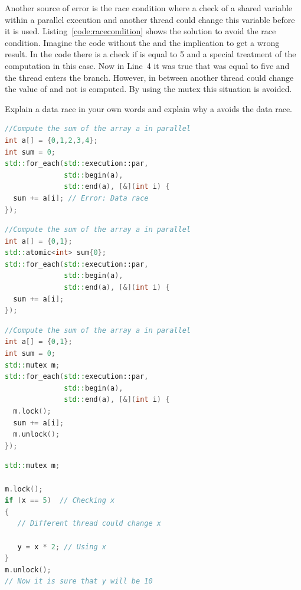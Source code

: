 \documentclass[11pt,fleqn]{book} %
\begin{document}
Another source of error is the race condition where a check of a shared variable within a parallel execution and another thread could change this variable before it is used. Listing~\ref{code:racecondition} shows the solution to avoid the race condition.  Imagine the code without the  and the implication to get a wrong result. In the code there is a check if  is equal to 5 and a special treatment of the computation in this case. Now in Line~4 it was true that  was equal to five and the thread enters the  branch. However, in between another thread could change the value of  and not  is computed. By using the mutex this situation is avoided.

\begin{exercise}
Explain a data race in your own words and explain why a  avoids the data race.
\end{exercise}

\begin{lstlisting}[language=c++,caption={Example code and Solution for a data race.\label{code:data:race}},float,floatplacement=tb]
//Compute the sum of the array a in parallel
int a[] = {0,1,2,3,4};
int sum = 0;
std::for_each(std::execution::par, 
              std::begin(a), 
              std::end(a), [&](int i) {
  sum += a[i]; // Error: Data race
});
\end{lstlisting}


\begin{lstlisting}[language=c++,caption={Solution to avoid the data race using \cpp{std::atomic}.\label{code:datarace:atomic}},float,floatplacement=tb]
//Compute the sum of the array a in parallel
int a[] = {0,1};
std::atomic<int> sum{0};
std::for_each(std::execution::par, 
              std::begin(a), 
              std::end(a), [&](int i) {
  sum += a[i]; 
});
\end{lstlisting}

\begin{lstlisting}[language=c++,caption={Solution to avoid the data race using \cpp{std::mutex}.\label{code:datarace:mutex}},float,floatplacement=tb]
//Compute the sum of the array a in parallel
int a[] = {0,1};
int sum = 0;
std::mutex m;
std::for_each(std::execution::par, 
              std::begin(a), 
              std::end(a), [&](int i) {
  m.lock();
  sum += a[i];
  m.unlock(); 
});
\end{lstlisting}


\begin{lstlisting}[language=c++,caption={Example for the race condition.\label{code:racecondition}},float,floatplacement=tb]
std::mutex m;

m.lock();
if (x == 5)  // Checking x
{
   // Different thread could change x 
      
   y = x * 2; // Using x
}
m.unlock();
// Now it is sure that y will be 10
\end{lstlisting}
\end{document}
